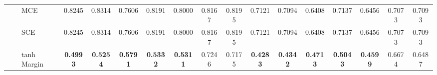 \documentclass[sigconf,authordraft]{acmart}
\begin{document}
\begin{table*}
{\begin{tabular}{lcl|ccccccc|ccccccc}
                                 &      & MCE &                  0.8245 &                  0.8314 &              0.7606 &                  0.8191 &           0.8000 &                       0.8167 &                       0.8195 &                  0.7121 &                  0.7094 &              0.6408 &                  0.7137 &           0.6456 &                       0.7073 &                       0.7093 \\
                                 &      & SCE &                  0.8245 &                  0.8314 &              0.7606 &                  0.8191 &           0.8000 &                       0.8167 &                       0.8195 &                  0.7121 &                  0.7094 &              0.6408 &                  0.7137 &           0.6456 &                       0.7073 &                       0.7093 \\
                                 &      & tanh Margin &         \textbf{0.4993} &         \textbf{0.5254} &     \textbf{0.5791} &         \textbf{0.5332} &  \textbf{0.5311} &                       0.7246 &                       0.7175 &         \textbf{0.4283} &         \textbf{0.4342} &     \textbf{0.4713} &         \textbf{0.5043} &  \textbf{0.4599} &                       0.6674 &                       0.6487 \\
    \bottomrule
  \end{tabular}
  }
\end{table*}
\end{document}
